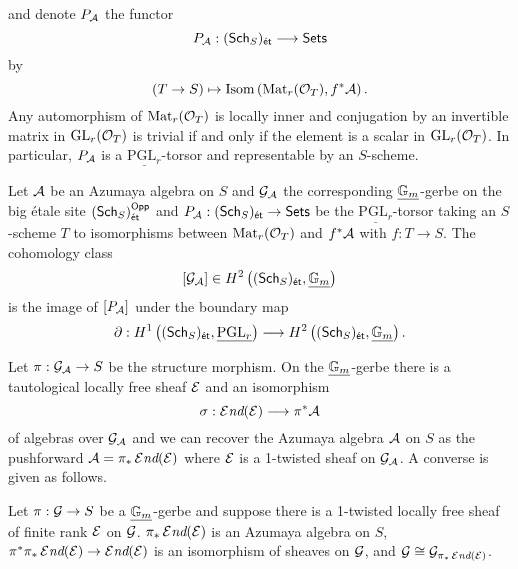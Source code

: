 and denote $P_{\mathcal{A}}$ the functor 
$$P_{\mathcal{A}}:(\mathsf{Sch}_{S})_{\mathsf{\acute{e}t}}\longrightarrow\mathsf{Sets}$$
by 
$$(T\to S)\mapsto\mathrm{Isom}\left(\mathrm{Mat}_{r}(\mathcal{O}_{T}),f^{*}\mathcal{A}\right).$$
Any automorphism of $\mathrm{Mat}_{r}(\mathcal{O}_{T})$ is locally inner and conjugation by an invertible matrix in $\mathrm{GL}_{r}(\mathcal{O}_{T})$ is trivial if and only if the element is a scalar in $\mathrm{GL}_{r}(\mathcal{O}_{T})$. In particular, $P_{\mathcal{A}}$ is a $\underline{\mathrm{PGL}_{r}}$-torsor and representable by an $S$-scheme. 
\begin{lemma}\label{lem: GA is the image of PA under the boundary map}
    Let $\mathcal{A}$ be an Azumaya algebra on $S$ and $\mathcal{G}_{\mathcal{A}}$ the corresponding $\underline{\mathbb{G}_{m}}$-gerbe on the big \'{e}tale site $(\mathsf{Sch}_{S})_{\mathsf{\acute{e}t}}^{\mathsf{Opp}}$ and $P_{\mathcal{A}}:(\mathsf{Sch}_{S})_{\mathsf{\acute{e}t}}\to\mathsf{Sets}$ be the $\underline{\mathrm{PGL}_{r}}$-torsor taking an $S$-scheme $T$ to isomorphisms between $\mathrm{Mat}_{r}(\mathcal{O}_{T})$ and $f^{*}\mathcal{A}$ with $f:T\to S$. The cohomology class 
    $$[\mathcal{G}_{\mathcal{A}}]\in H^{2}\left((\mathsf{Sch}_{S})_{\mathsf{\acute{e}t}},\underline{\mathbb{G}_{m}}\right)$$
    is the image of $[P_{\mathcal{A}}]$ under the boundary map 
    $$\partial:H^{1}\left((\mathsf{Sch}_{S})_{\mathsf{\acute{e}t}},\underline{\mathrm{PGL}_{r}}\right)\longrightarrow H^{2}\left((\mathsf{Sch}_{S})_{\mathsf{\acute{e}t}},\underline{\mathbb{G}_{m}}\right).$$
\end{lemma}
Let $\pi:\mathcal{G}_{\mathcal{A}}\to S$ be the structure morphism. On the $\underline{\mathbb{G}_{m}}$-gerbe there is a tautological locally free sheaf $\mathcal{E}$ and an isomorphism 
$$\sigma:\operatorname{\mathcal{E}\emph{nd}}(\mathcal{E})\longrightarrow \pi^{*}\mathcal{A}$$
of algebras over $\mathcal{G}_{\mathcal{A}}$ and we can recover the Azumaya algebra $\mathcal{A}$ on $S$ as the pushforward $\mathcal{A}=\pi_{*}\operatorname{\mathcal{E}\emph{nd}}(\mathcal{E})$ where $\mathcal{E}$ is a 1-twisted sheaf on $\mathcal{G}_{\mathcal{A}}$. A converse is given as follows. 
\begin{proposition}\label{prop: pushfoward of gerbes and azumaya algebras}
    Let $\pi:\mathcal{G}\to S$ be a $\underline{\mathbb{G}_{m}}$-gerbe and suppose there is a 1-twisted locally free sheaf of finite rank $\mathcal{E}$ on $\mathcal{G}$. $\pi_{*}\operatorname{\mathcal{E}\emph{nd}}(\mathcal{E})$ is an Azumaya algebra on $S$, $\pi^{*}\pi_{*}\operatorname{\mathcal{E}\emph{nd}}(\mathcal{E})\to\operatorname{\mathcal{E}\emph{nd}}(\mathcal{E})$ is an isomorphism of sheaves on $\mathcal{G}$, and $\mathcal{G}\cong\mathcal{G}_{\pi_{*}\operatorname{\mathcal{E}\emph{nd}}(\mathcal{E})}$. 
\end{proposition}